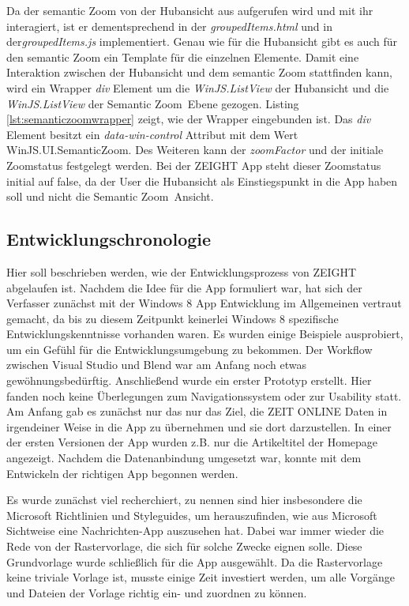 \documentclass[12pt,a4paper,bibtotoc,abstracton]{scrartcl}
\begin{document}
Da der semantic Zoom von der Hubansicht aus aufgerufen wird und mit ihr interagiert, ist er dementsprechend in der \textit{groupedItems.html} und in der\textit{groupedItems.js} implementiert. Genau wie für die Hubansicht gibt es auch für den semantic Zoom ein Template für die einzelnen Elemente. Damit eine Interaktion zwischen der Hubansicht und dem semantic Zoom stattfinden kann, wird ein Wrapper \textit{div} Element um die \textit{WinJS.ListView} der Hubansicht und die \textit{WinJS.ListView} der \glqq Semantic Zoom\grqq\ Ebene gezogen. Listing \ref{lst:semanticzoomwrapper} zeigt, wie der Wrapper eingebunden ist. Das \textit{div} Element besitzt ein \textit{data-win-control} Attribut mit dem Wert \glqq WinJS.UI.SemanticZoom\grqq. Des Weiteren kann der \textit{zoomFactor} und der initiale Zoomstatus festgelegt werden. Bei der ZEIGHT App steht dieser Zoomstatus initial auf \glqq false\grqq, da der User die Hubansicht als Einstiegspunkt in die App haben soll und nicht die \glqq Semantic Zoom\grqq\ Ansicht.

\begin{minipage}{\linewidth}
  
\end{minipage}

\subsection{Entwicklungschronologie}
\label{subsec:entwicklungschronologie}
Hier soll beschrieben werden, wie der Entwicklungsprozess von ZEIGHT abgelaufen ist. Nachdem die Idee für die App formuliert war, hat sich der Verfasser zunächst mit der Windows 8 App Entwicklung im Allgemeinen vertraut gemacht, da bis zu diesem Zeitpunkt keinerlei Windows 8 spezifische Entwicklungskenntnisse vorhanden waren. Es wurden einige Beispiele ausprobiert, um ein Gefühl für die Entwicklungsumgebung zu bekommen. Der Workflow zwischen Visual Studio und Blend war am Anfang noch etwas gewöhnungsbedürftig. Anschließend wurde ein erster Prototyp erstellt. Hier fanden noch keine Überlegungen zum Navigationssystem oder zur Usability statt. Am Anfang gab es zunächst nur das nur das Ziel, die ZEIT ONLINE Daten in irgendeiner Weise in die App zu übernehmen und sie dort darzustellen. In einer der ersten Versionen der App wurden z.B. nur die Artikeltitel der Homepage angezeigt. Nachdem die Datenanbindung umgesetzt war, konnte mit dem Entwickeln der richtigen App begonnen werden.

Es wurde zunächst viel recherchiert, zu nennen sind hier insbesondere die Microsoft Richtlinien und Styleguides, um herauszufinden, wie aus Microsoft Sichtweise eine Nachrichten-App auszusehen hat. Dabei war immer wieder die Rede von der Rastervorlage, die sich für solche Zwecke eignen solle. Diese Grundvorlage wurde schließlich für die App ausgewählt. Da die Rastervorlage keine triviale Vorlage ist, musste einige Zeit investiert werden, um alle Vorgänge und Dateien der Vorlage richtig ein- und zuordnen zu können. 
\end{document}
